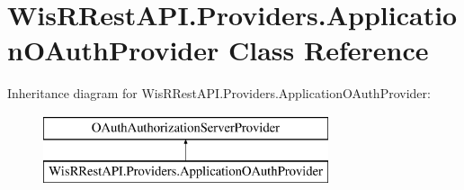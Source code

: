 \hypertarget{class_wis_r_rest_a_p_i_1_1_providers_1_1_application_o_auth_provider}{}\section{Wis\+R\+Rest\+A\+P\+I.\+Providers.\+Application\+O\+Auth\+Provider Class Reference}
\label{class_wis_r_rest_a_p_i_1_1_providers_1_1_application_o_auth_provider}
Inheritance diagram for Wis\+R\+Rest\+A\+P\+I.\+Providers.\+Application\+O\+Auth\+Provider\+:\begin{figure}[H]
\begin{center}
\leavevmode
\includegraphics[height=2.000000cm]{class_wis_r_rest_a_p_i_1_1_providers_1_1_application_o_auth_provider}
\end{center}
\end{figure}

